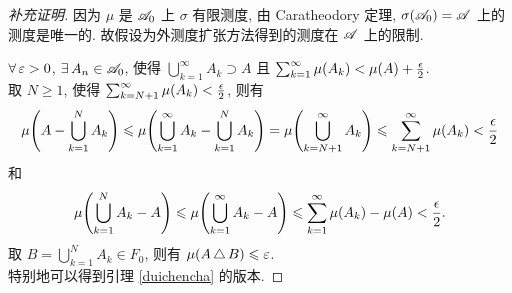 \begin{proof}[补充证明]
因为 $\mu$ 是 $\mathscr{A}_0$ 上 $\sigma$ 有限测度, 由 Caratheodory 定理, $\sigma\xk{\SA_0}=\SA$ 上的测度是唯一的. 故假设为外测度扩张方法得到的测度在 $\mathscr{A}$ 上的限制.\par
$\forall\eps>0$, $\exists A_n\in\SA_0$, 使得 $\bigcup_{k=1}^{\infty}A_k\supset A$ 且 $\sum_{k=1}^{\infty}\mu\xk{A_k}<\mu\xk{A}+\frac{\epsilon}{2}$.\\
取 $N\geq 1$, 使得 $\sum_{k=N+1}^{\infty}\mu\xk{A_k}<\frac{\epsilon}{2}$, 则有
\[\mu\xk{A-\bigcup_{k=1}^{N}A_k}\leq\mu\xk{\bigcup_{k=1}^{\infty}A_k-\bigcup_{k=1}^{N}A_k}=\mu\xk{\bigcup_{k=N+1}^{\infty}A_k}\leq\sum_{k=N+1}^{\infty}\mu\xk{A_k}<\frac{\epsilon}{2}\]
和
\[\mu\xk{\bigcup_{k=1}^{N}A_k-A}\leq\mu\xk{\bigcup_{k=1}^{\infty}A_k-A}\leq\sum_{k=1}^{\infty}\mu\xk{A_k}-\mu\xk{A}<\frac{\epsilon}{2}.\]
取 $B=\bigcup_{k=1}^{N}A_k\in F_0$, 则有 $\mu\xk{A\sj B}\leq\eps$.\\
特别地可以得到引理 \ref{duichencha} 的版本.
\end{proof}

